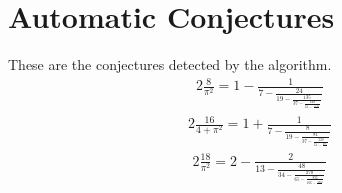 \documentclass{article}%
\begin{document}
%
\normalsize%
\section{Automatic Conjectures}%
\label{sec:AutomaticConjectures}%
These are the conjectures detected by the algorithm.%
\begin{alignat*}{2}%
\frac{8}{\pi^{2}} = 1 - \frac{1}{7 - \frac{24}{19 - \frac{135}{37 - \frac{448}{61 - \frac{1125}{..}}}}}%
\end{alignat*}%
\begin{alignat*}{2}%
\frac{16}{4 + \pi^{2}} = 1 + \frac{1}{7 - \frac{8}{19 - \frac{81}{37 - \frac{320}{61 - \frac{875}{..}}}}}%
\end{alignat*}%
\begin{alignat*}{2}%
\frac{18}{\pi^{2}} = 2 - \frac{2}{13 - \frac{48}{34 - \frac{270}{65 - \frac{896}{106 - \frac{2250}{..}}}}}%
\end{alignat*}

%
\end{document}
